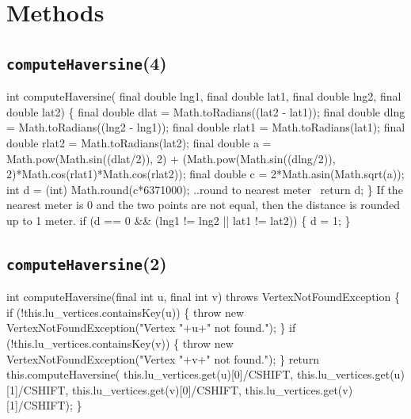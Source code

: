 \section{Methods}

\subsection{\texttt{computeHaversine}(4)}
\nwenddocs{}\endmoddef{}
int computeHaversine(
    final double lng1, final double lat1, final double lng2, final double lat2) \{
  final double  dlat = Math.toRadians((lat2 - lat1));
  final double  dlng = Math.toRadians((lng2 - lng1));
  final double rlat1 = Math.toRadians(lat1);
  final double rlat2 = Math.toRadians(lat2);
  final double a = Math.pow(Math.sin((dlat/2)), 2)
    + (Math.pow(Math.sin((dlng/2)), 2)*Math.cos(rlat1)*Math.cos(rlat2));
  final double c = 2*Math.asin(Math.sqrt(a));
  int d = (int) Math.round(c*6371000);
  \LA{}..round to nearest meter~{\nwtagstyle{}}\RA{}
  return d;
\}
\eatline
{}\nwendcode{}If the nearest meter is 0 and the two points are not equal, then the distance
is rounded up to 1 meter.
\nwenddocs{}\endmoddef{}
if (d == 0 && (lng1 != lng2 || lat1 != lat2)) \{
  d = 1;
\}
\nwendcode{}\nwdocspar

\subsection{\texttt{computeHaversine}(2)}
\nwenddocs{}\endmoddef{}
int computeHaversine(final int u, final int v) throws VertexNotFoundException \{
  if (!this.lu_vertices.containsKey(u)) \{
    throw new VertexNotFoundException("Vertex "+u+" not found.");
  \}
  if (!this.lu_vertices.containsKey(v)) \{
    throw new VertexNotFoundException("Vertex "+v+" not found.");
  \}
  return this.computeHaversine(
    this.lu_vertices.get(u)[0]/CSHIFT, this.lu_vertices.get(u)[1]/CSHIFT,
    this.lu_vertices.get(v)[0]/CSHIFT, this.lu_vertices.get(v)[1]/CSHIFT);
\}
\nwendcode{}\nwdocspar


